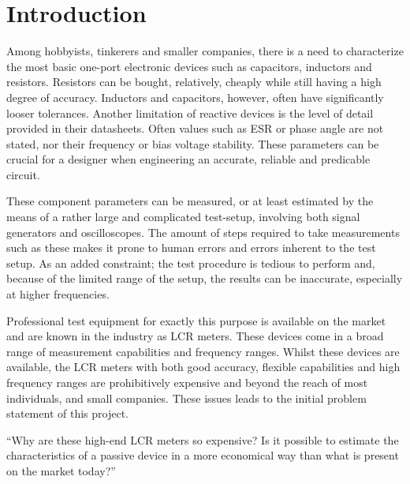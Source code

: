 \chapter{Introduction} \label{ch:Introduction}
Among hobbyists, tinkerers and smaller companies, there is a need to characterize the most basic one-port electronic devices such as capacitors, inductors and resistors. Resistors can be bought, relatively, cheaply while still having a high degree of accuracy. Inductors and capacitors, however, often have significantly looser tolerances. Another limitation of reactive devices is the level of detail provided in their datasheets. Often values such as ESR or phase angle are not stated, nor their frequency or bias voltage stability. These parameters can be crucial for a designer when engineering an accurate, reliable and predicable circuit.

These component parameters can be measured, or at least estimated by the means of a rather large and complicated test-setup, involving both signal generators and oscilloscopes. The amount of steps required to take measurements such as these makes it prone to human errors and errors inherent to the test setup. As an added constraint; the test procedure is tedious to perform and, because of the limited range of the setup, the results can be inaccurate, especially at higher frequencies.

Professional test equipment for exactly this purpose is available on the market and are known in the industry as LCR meters. These devices come in a broad range of measurement capabilities and frequency ranges. Whilst these devices are available, the LCR meters with both good accuracy, flexible capabilities and high frequency ranges are prohibitively expensive and beyond the reach of most individuals, and small companies. These issues leads to the initial problem statement of this project.

“Why are these high-end LCR meters so expensive? Is it possible to estimate the characteristics of a passive device in a more economical way than what is present on the market today?”
